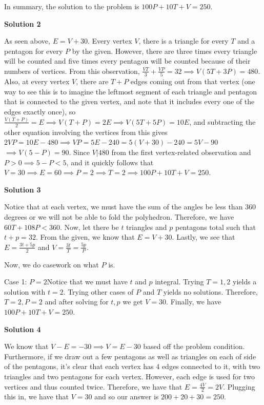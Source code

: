 \begin{enumerate}
 In summary, the solution to the problem is $100P+10T+V=\boxed{250}$.

 



\textbf{Solution 2}

As seen above, $E=V+30$. Every vertex $V$, there is a triangle for every $T$ and a pentagon for every $P$ by the given. However, there are three times every triangle will be counted and five times every pentagon will be counted because of their numbers of vertices. From this observation, $\frac{VT}3+\frac{VP}5=32\implies V(5T+3P)=480$. Also, at every vertex $V$, there are $T+P$ edges coming out from that vertex (one way to see this is to imagine the leftmost segment of each triangle and pentagon that is connected to the given vertex, and note that it includes every one of the edges exactly once), so $\frac{V(T+P)}2=E\implies V(T+P)=2E\implies V(5T+5P)=10E$, and subtracting the other equation involving the vertices from this gives$2VP=10E-480\implies VP=5E-240=5(V+30)-240=5V-90$$\implies V(5-P)=90$. Since $V|480$ from the first vertex-related observation and $P>0\implies5-P<5$, and it quickly follows that $V=30\implies E=60\implies P=2\implies T=2\implies100P+10T+V=\boxed{250}$.

 


 



\textbf{Solution 3}

Notice that at each vertex, we must have the sum of the angles be less than $360$ degrees or we will not be able to fold the polyhedron.  Therefore, we have $60T + 108P < 360.$ Now, let there be $t$ triangles and $p$ pentagons total such that $t+p = 32.$  From the given, we know that $E = V + 30.$  Lastly, we see that $E = \frac{3t+5p}{2}$ and $V = \frac{3t}{T}=\frac{5p}{P}.$ 

 Now, we do casework on what $P$ is.  

 Case 1: $P = 2$Notice that we must have $t$ and $p$ integral.  Trying $T = 1, 2$ yields a solution with $t=2.$  Trying other cases of $P$ and $T$ yields no solutions.  Therefore, $T=2, P=2$ and after solving for $t, p$ we get $V=30.$  Finally, we have $100P+10T+V = \boxed{250}$.

 



\textbf{Solution 4}

We know that $V-E = -30 \implies V = E-30$ based off the problem condition. Furthermore, if we draw out a few pentagons as well as triangles on each of side of the pentagons, it's clear that each vertex has 4 edges connected to it, with two triangles and two pentagons for each vertex. However, each edge is used for two vertices and thus counted twice. Therefore, we have that $E = \frac{4V}{2} = 2V$. Plugging this in, we have that $V=30$ and so our answer is $200+20+30 = \boxed{250}$.


\end{enumerate}
